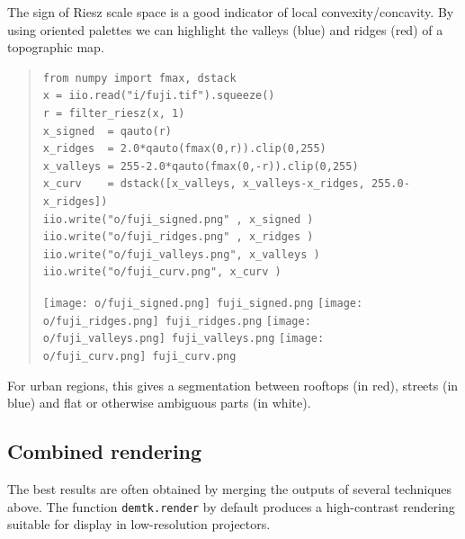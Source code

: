 The sign of Riesz scale space is a good indicator of local
convexity/concavity.  By using oriented palettes we can highlight the valleys
(blue)
and ridges (red) of a topographic map.  

\begin{quote}
\begin{verbatim}
from numpy import fmax, dstack
x = iio.read("i/fuji.tif").squeeze()
r = filter_riesz(x, 1)
x_signed  = qauto(r)
x_ridges  = 2.0*qauto(fmax(0,r)).clip(0,255)
x_valleys = 255-2.0*qauto(fmax(0,-r)).clip(0,255)
x_curv    = dstack([x_valleys, x_valleys-x_ridges, 255.0-x_ridges])
iio.write("o/fuji_signed.png" , x_signed )
iio.write("o/fuji_ridges.png" , x_ridges )
iio.write("o/fuji_valleys.png", x_valleys )
iio.write("o/fuji_curv.png", x_curv )
\end{verbatim}
\texttt{[image: o/fuji\_signed.png]}~\verb+fuji_signed.png+
\texttt{[image: o/fuji\_ridges.png]}~\verb+fuji_ridges.png+
\texttt{[image: o/fuji\_valleys.png]}~\verb+fuji_valleys.png+
\texttt{[image: o/fuji\_curv.png]}~\verb+fuji_curv.png+
\end{quote}

For urban regions, this gives a segmentation between rooftops (in red),
streets (in blue) and flat or otherwise ambiguous parts (in white).

%

\clearpage
\subsection{Combined rendering}

The best results are often obtained by merging the outputs of several
techniques above.  The function \verb+demtk.render+ by default produces a
high-contrast rendering suitable for display in low-resolution projectors.

